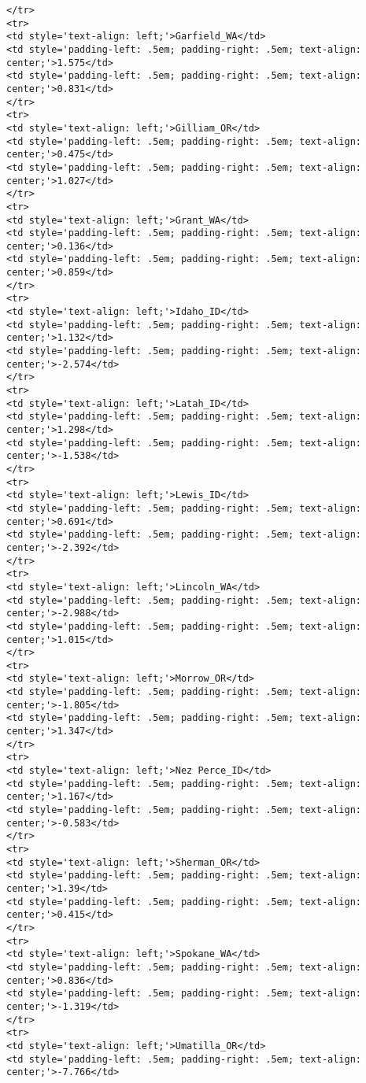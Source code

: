 \documentclass[]{article}
\begin{document}
\begin{verbatim}
</tr>
<tr>
<td style='text-align: left;'>Garfield_WA</td>
<td style='padding-left: .5em; padding-right: .5em; text-align: center;'>1.575</td>
<td style='padding-left: .5em; padding-right: .5em; text-align: center;'>0.831</td>
</tr>
<tr>
<td style='text-align: left;'>Gilliam_OR</td>
<td style='padding-left: .5em; padding-right: .5em; text-align: center;'>0.475</td>
<td style='padding-left: .5em; padding-right: .5em; text-align: center;'>1.027</td>
</tr>
<tr>
<td style='text-align: left;'>Grant_WA</td>
<td style='padding-left: .5em; padding-right: .5em; text-align: center;'>0.136</td>
<td style='padding-left: .5em; padding-right: .5em; text-align: center;'>0.859</td>
</tr>
<tr>
<td style='text-align: left;'>Idaho_ID</td>
<td style='padding-left: .5em; padding-right: .5em; text-align: center;'>1.132</td>
<td style='padding-left: .5em; padding-right: .5em; text-align: center;'>-2.574</td>
</tr>
<tr>
<td style='text-align: left;'>Latah_ID</td>
<td style='padding-left: .5em; padding-right: .5em; text-align: center;'>1.298</td>
<td style='padding-left: .5em; padding-right: .5em; text-align: center;'>-1.538</td>
</tr>
<tr>
<td style='text-align: left;'>Lewis_ID</td>
<td style='padding-left: .5em; padding-right: .5em; text-align: center;'>0.691</td>
<td style='padding-left: .5em; padding-right: .5em; text-align: center;'>-2.392</td>
</tr>
<tr>
<td style='text-align: left;'>Lincoln_WA</td>
<td style='padding-left: .5em; padding-right: .5em; text-align: center;'>-2.988</td>
<td style='padding-left: .5em; padding-right: .5em; text-align: center;'>1.015</td>
</tr>
<tr>
<td style='text-align: left;'>Morrow_OR</td>
<td style='padding-left: .5em; padding-right: .5em; text-align: center;'>-1.805</td>
<td style='padding-left: .5em; padding-right: .5em; text-align: center;'>1.347</td>
</tr>
<tr>
<td style='text-align: left;'>Nez Perce_ID</td>
<td style='padding-left: .5em; padding-right: .5em; text-align: center;'>1.167</td>
<td style='padding-left: .5em; padding-right: .5em; text-align: center;'>-0.583</td>
</tr>
<tr>
<td style='text-align: left;'>Sherman_OR</td>
<td style='padding-left: .5em; padding-right: .5em; text-align: center;'>1.39</td>
<td style='padding-left: .5em; padding-right: .5em; text-align: center;'>0.415</td>
</tr>
<tr>
<td style='text-align: left;'>Spokane_WA</td>
<td style='padding-left: .5em; padding-right: .5em; text-align: center;'>0.836</td>
<td style='padding-left: .5em; padding-right: .5em; text-align: center;'>-1.319</td>
</tr>
<tr>
<td style='text-align: left;'>Umatilla_OR</td>
<td style='padding-left: .5em; padding-right: .5em; text-align: center;'>-7.766</td>

\end{verbatim}
\end{document}
